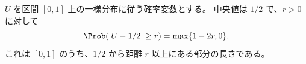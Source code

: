$U$ を区間 $[0,1]$ 上の一様分布に従う確率変数とする。
中央値は $1/2$ で、$r>0$ に対して
\[
  \Prob(|U-1/2|\ge r)=\max\{1-2r,0\}.
\]
これは $[0,1]$ のうち、$1/2$ から距離 $r$ 以上にある部分の長さである。
